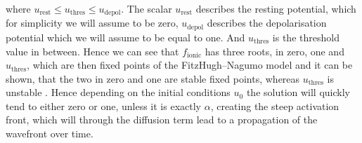 \documentclass[../draft_1.tex]{subfiles}
\begin{document}
where $u_{\text{rest}} \leq u_{\text{thres}} \leq u_{\text{depol}}$. The scalar $u_{\text{rest}}$ describes the resting potential, which for simplicity we will assume to be zero, $u_{\text{depol}}$ describes the depolarisation potential which we will assume to be equal to one. And $u_{\text{thres}}$ is the threshold value in between. Hence we can see that $f_{\text{ionic}}$ has three roots, in zero, one and $u_{\text{thres}}$, which are then fixed points of the FitzHugh--Nagumo model and it can be shown, that the two in zero and one are stable fixed points, whereas $u_{\text{thres}}$ is unstable \cite{deuflhard2011adaptive}. Hence depending on the initial conditions $u_0$ the solution will quickly tend to either zero or one, unless it is exactly $\alpha$, creating the steep activation front, which will through the diffusion term lead to a propagation of the wavefront over time.
\smallskip
\\
\end{document}

